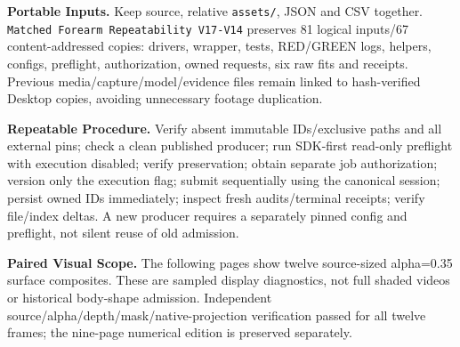 \documentclass[11pt,letterpaper]{article}
\newcommand{\code}[1]{\nolinkurl{#1}}\newcommand{\hash}[1]{{\footnotesize\nolinkurl{#1}}}
\begin{document}
\textbf{Portable Inputs.} Keep source, relative \code{assets/}, JSON and CSV together.
\code{Matched Forearm Repeatability V17-V14} preserves 81 logical inputs/67 content-addressed
copies: drivers, wrapper, tests, RED/GREEN logs, helpers, configs, preflight, authorization,
owned requests, six raw fits and receipts. Previous media/capture/model/evidence files remain
linked to hash-verified Desktop copies, avoiding unnecessary footage duplication.

\textbf{Repeatable Procedure.} Verify absent immutable IDs/exclusive paths and all external pins;
check a clean published producer; run SDK-first read-only preflight with execution disabled;
verify preservation; obtain separate job authorization; version only the execution flag;
submit sequentially using the canonical session; persist owned IDs immediately; inspect
fresh audits/terminal receipts; verify file/index deltas. A new producer requires a separately
pinned config and preflight, not silent reuse of old admission.

\textbf{Paired Visual Scope.} The following pages show twelve source-sized alpha=0.35 surface composites.
These are sampled display diagnostics, not full shaded videos or historical body-shape admission.
Independent source/alpha/depth/mask/native-projection verification passed for all twelve frames; the nine-page numerical edition is preserved separately.
\end{document}

